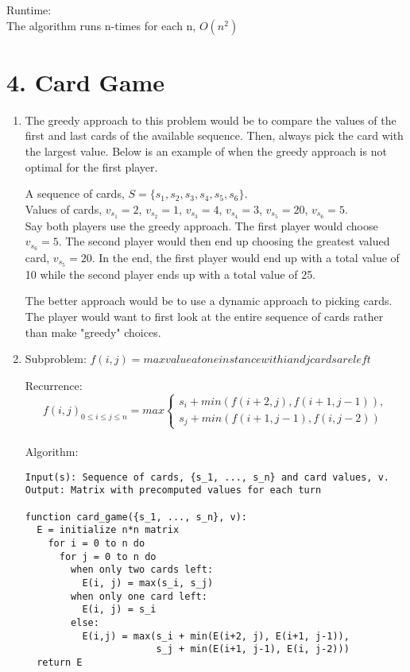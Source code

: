 \documentclass[11pt]{article}
\newenvironment{qparts}{\begin{enumerate}[{(}a{)}]}{\end{enumerate}}
\begin{document}
Runtime:\\
The algorithm runs n-times for each n, $O(n^2)$


\newpage
\section*{4. Card Game}
\begin{qparts}

\item 
The greedy approach to this problem would be to compare the values of the first and last cards of the available sequence. Then, always pick the card with the largest value. Below is an example of when the greedy approach is not optimal for the first player.

A sequence of cards, $S = \{s_1, s_2, s_3, s_4, s_5, s_6\}$.\\
Values of cards, $v_{s_1} = 2$, $v_{s_2} = 1$, $v_{s_3} = 4$, $v_{s_4} = 3$, $v_{s_5} = 20$, $v_{s_6} = 5$.\\
Say both players use the greedy approach. The first player would choose $v_{s_6} = 5$. The second player would then end up choosing the greatest valued card, $v_{s_5} = 20$. In the end, the first player would end up with a total value of 10 while the second player ends up with a total value of 25.

The better approach would be to use a dynamic approach to picking cards. The player would want to first look at the entire sequence of cards rather than make "greedy" choices.

\item 

Subproblem: $f(i, j) = max value at one instance with i and j cards are left$

Recurrence: 
\begin{equation}
  f(i, j)_{0 \leq i \leq j \leq n}=max\begin{cases}
    s_i + min(f(i+2, j), f(i+1, j-1)),\\
    s_j + min(f(i+1, j-1), f(i, j-2)) 
  \end{cases}
\end{equation}\\

Algorithm:
\begin{lstlisting}
Input(s): Sequence of cards, {s_1, ..., s_n} and card values, v.
Output: Matrix with precomputed values for each turn 

function card_game({s_1, ..., s_n}, v):
  E = initialize n*n matrix
    for i = 0 to n do 
      for j = 0 to n do 
        when only two cards left:
          E(i, j) = max(s_i, s_j)
        when only one card left:
          E(i, j) = s_i
        else:
          E(i,j) = max(s_i + min(E(i+2, j), E(i+1, j-1)),
                       s_j + min(E(i+1, j-1), E(i, j-2)))
  return E


\end{lstlisting}

\end{qparts}
\end{document}
